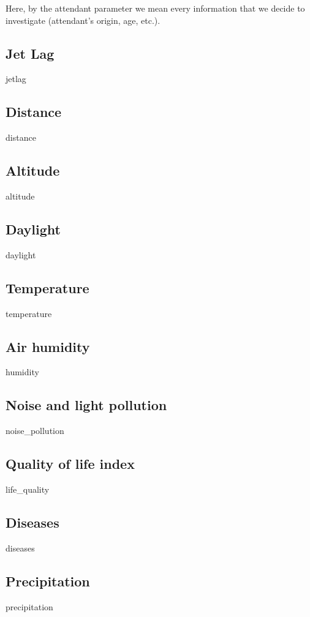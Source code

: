 Here, by the attendant parameter we mean every information that we decide to investigate (attendant's origin, age, etc.).

\subsection{Jet Lag}
{jetlag}

\subsection{Distance}
{distance}

\subsection{Altitude}
{altitude}

\subsection{Daylight}
{daylight}

\subsection{Temperature}
{temperature}

\subsection{Air humidity}
{humidity}

\subsection{Noise and light pollution}
{noise_pollution}

\subsection{Quality of life index}
{life_quality}

\subsection{Diseases}
{diseases}

\subsection{Precipitation}
{precipitation}
